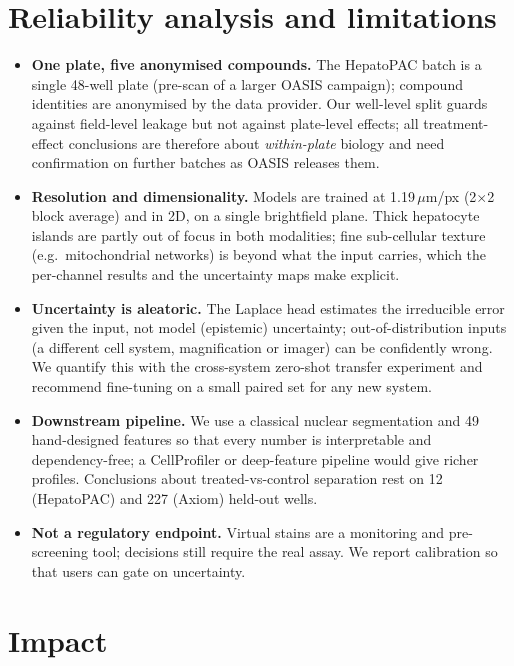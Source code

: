 \documentclass[11pt,a4paper]{article}
\begin{document}
\section{Reliability analysis and limitations}
\label{sec:limitations}
\begin{itemize}
\item \textbf{One plate, five anonymised compounds.} The HepatoPAC batch is a single 48-well plate (pre-scan of a larger OASIS campaign); compound identities are anonymised by the data provider. Our well-level split guards against field-level leakage but not against plate-level effects; all treatment-effect conclusions are therefore about \emph{within-plate} biology and need confirmation on further batches as OASIS releases them.
\item \textbf{Resolution and dimensionality.} Models are trained at 1.19\,$\mu$m/px (2$\times$2 block average) and in 2D, on a single brightfield plane. Thick hepatocyte islands are partly out of focus in both modalities; fine sub-cellular texture (e.g.\ mitochondrial networks) is beyond what the input carries, which the per-channel results and the uncertainty maps make explicit.
\item \textbf{Uncertainty is aleatoric.} The Laplace head estimates the irreducible error given the input, not model (epistemic) uncertainty; out-of-distribution inputs (a different cell system, magnification or imager) can be confidently wrong. We quantify this with the cross-system zero-shot transfer experiment and recommend fine-tuning on a small paired set for any new system.
\item \textbf{Downstream pipeline.} We use a classical nuclear segmentation and 49 hand-designed features so that every number is interpretable and dependency-free; a CellProfiler or deep-feature pipeline would give richer profiles. Conclusions about treated-vs-control separation rest on 12 (HepatoPAC) and 227 (Axiom) held-out wells.
\item \textbf{Not a regulatory endpoint.} Virtual stains are a monitoring and pre-screening tool; decisions still require the real assay. We report calibration so that users can gate on uncertainty.
\end{itemize}

\section{Impact}
\label{sec:impact}
\end{document}
